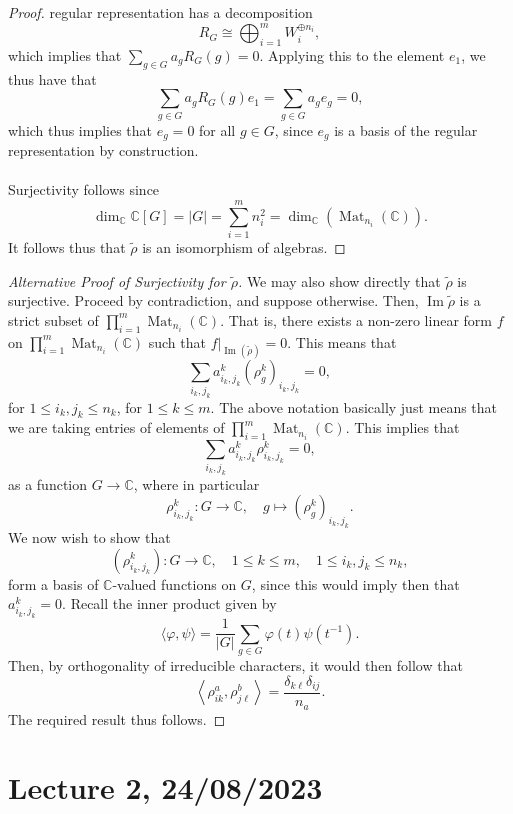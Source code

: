 \documentclass[a4paper]{report}
\theoremstyle{definition}
\theoremstyle{remark}
\theoremstyle{proposition}
\theoremstyle{conjecture}
\theoremstyle{lemma}
\theoremstyle{corollary}
\theoremstyle{exercise}
\theoremstyle{example}
\newcommand{\C}{\mathbb{C}}
\newcommand{\on}{\operatorname}
\begin{document}
\begin{proof}
    regular representation has a decomposition 
    $$R_G \cong \bigoplus_{i=1}^m W_i^{\oplus n_i},$$
    which implies that $\sum_{g\in G}a_g R_G(g) = 0$. Applying 
    this to the element $e_1$, we thus have that 
    $$\sum_{g \in G} a_g R_G(g)e_1 = \sum_{g \in G} a_g e_g = 0,$$
    which thus implies that $e_g = 0$ for all $g \in G$, since 
    $e_g$ is a basis of the regular representation by construction.\\\\
    Surjectivity follows since 
    $$\dim_\C \C[G] = \vert G \vert = \sum_{i=1}^m n_i^2 = \dim_\C \left(\on{Mat}_{n_i}(\C)\right).$$
    It follows thus that $\widetilde{\rho}$ is an isomorphism of 
    algebras.
\end{proof}

\begin{proof}[Alternative Proof of Surjectivity for $\widetilde{\rho}$]
    We may also show directly that $\widetilde{\rho}$ is surjective.
    Proceed by contradiction, and suppose otherwise. Then, 
    $\on{Im}\widetilde{\rho}$ is a strict subset of 
    $\prod_{i=1}^m\on{Mat}_{n_i}(\C)$.
    That is, there exists a non-zero linear form 
    $f$ on $\prod_{i=1}^m \on{Mat}_{n_i}(\C)$ such that 
    $f\vert_{\on{Im}(\widetilde{\rho})} = 0$. This means that 
    $$\sum_{i_k,j_k} a_{i_k,j_k}^k (\rho^k_g)_{i_k,j_k} = 0,$$
    for $1\leq i_k,j_k\leq n_k$, for $1\leq k \leq m$. 
    The above notation basically just means that we are taking 
    entries of elements of $\prod_{i=1}^m\on{Mat}_{n_i}(\C)$.
    This implies that 
    $$\sum_{i_k,j_k} a^k_{i_k,j_k} \rho^k_{i_k,j_k} = 0,$$
    as a function $G \to \C$, where in particular
    $$\rho^k_{i_k,j_k} : G \longrightarrow \C, \quad g \longmapsto (\rho_g^k)_{i_k,j_k}.$$
    We now wish to show that 
    $$(\rho_{i_k,j_k}^k) : G \to \C,\quad 1\leq k \leq m, \quad 1\leq i_k,j_k \leq n_k,$$ form a basis of $\C$-valued functions on $G$, since this would imply then that
     $a^k_{i_k,j_k} = 0$. Recall the inner product given by 
     $$\langle \varphi,\psi\rangle = \frac{1}{\vert G\vert} \sum_{g \in G} \varphi(t) \psi(t^{-1}).$$
     Then, by orthogonality of irreducible characters, it would then follow
     that 
     $$\left\langle \rho_{ik}^a, \rho_{j\ell}^b\right\rangle = \frac{\delta_{k\ell}\delta_{ij}}{n_a}.$$
     The required result thus follows.
\end{proof}


\section{Lecture 2, 24/08/2023}
\end{document}
